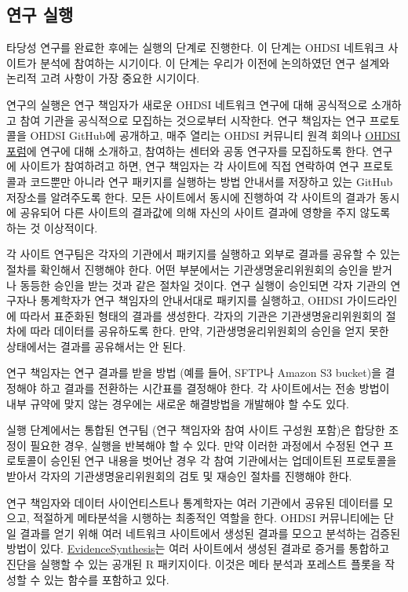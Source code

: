 \documentclass[10.5pt]{book}
\theoremstyle{definition}
\theoremstyle{definition}
\theoremstyle{definition}
\theoremstyle{remark}
\begin{document}
\subsection{연구 실행}\label{--1}

타당성 연구를 완료한 후에는 실행의 단계로 진행한다. 이 단계는 OHDSI
네트워크 사이트가 분석에 참여하는 시기이다. 이 단계는 우리가 이전에
논의하였던 연구 설계와 논리적 고려 사항이 가장 중요한 시기이다.

연구의 실행은 연구 책임자가 새로운 OHDSI 네트워크 연구에 대해 공식적으로
소개하고 참여 기관을 공식적으로 모집하는 것으로부터 시작한다. 연구
책임자는 연구 프로토콜을 OHDSI GitHub에 공개하고, 매주 열리는 OHDSI
커뮤니티 원격 회의나 \href{http://forums.ohdsi.org}{OHDSI 포럼}에 연구에
대해 소개하고, 참여하는 센터와 공동 연구자를 모집하도록 한다. 연구에
사이트가 참여하려고 하면, 연구 책임자는 각 사이트에 직접 연락하여 연구
프로토콜과 코드뿐만 아니라 연구 패키지를 실행하는 방법 안내서를 저장하고
있는 GitHub 저장소를 알려주도록 한다. 모든 사이트에서 동시에 진행하여 각
사이트의 결과가 동시에 공유되어 다른 사이트의 결과값에 의해 자신의
사이트 결과에 영향을 주지 않도록 하는 것 이상적이다.

각 사이트 연구팀은 각자의 기관에서 패키지를 실행하고 외부로 결과를
공유할 수 있는 절차를 확인해서 진행해야 한다. 어떤 부분에서는
기관생명윤리위원회의 승인을 받거나 동등한 승인을 받는 것과 같은 절차일
것이다. 연구 실행이 승인되면 각자 기관의 연구자나 통계학자가 연구
책임자의 안내서대로 패키지를 실행하고, OHDSI 가이드라인에 따라서
표준화된 형태의 결과를 생성한다. 각자의 기관은 기관생명윤리위원회의
절차에 따라 데이터를 공유하도록 한다. 만약, 기관생명윤리위원회의 승인을
얻지 못한 상태에서는 결과를 공유해서는 안 된다.

연구 책임자는 연구 결과를 받을 방법 (예를 들어, SFTP나 Amazon S3
bucket)을 결정해야 하고 결과를 전환하는 시간표를 결정해야 한다. 각
사이트에서는 전송 방법이 내부 규약에 맞지 않는 경우에는 새로운
해결방법을 개발해야 할 수도 있다.

실행 단계에서는 통합된 연구팀 (연구 책임자와 참여 사이트 구성원 포함)은
합당한 조정이 필요한 경우, 실행을 반복해야 할 수 있다. 만약 이러한
과정에서 수정된 연구 프로토콜이 승인된 연구 내용을 벗어난 경우 각 참여
기관에서는 업데이트된 프로토콜을 받아서 각자의 기관생명윤리위원회의 검토
및 재승인 절차를 진행해야 한다.

연구 책임자와 데이터 사이언티스트나 통계학자는 여러 기관에서 공유된
데이터를 모으고, 적절하게 메타분석을 시행하는 최종적인 역할을 한다.
OHDSI 커뮤니티에는 단일 결과를 얻기 위해 여러 네트워크 사이트에서 생성된
결과를 모으고 분석하는 검증된 방법이 있다.
\href{https://github.com/OHDSI/EvidenceSynthesis}{EvidenceSynthesis}는
여러 사이트에서 생성된 결과로 증거를 통합하고 진단을 실행할 수 있는
공개된 R 패키지이다. 이것은 메타 분석과 포레스트 플롯을 작성할 수 있는
함수를 포함하고 있다.
\end{document}
